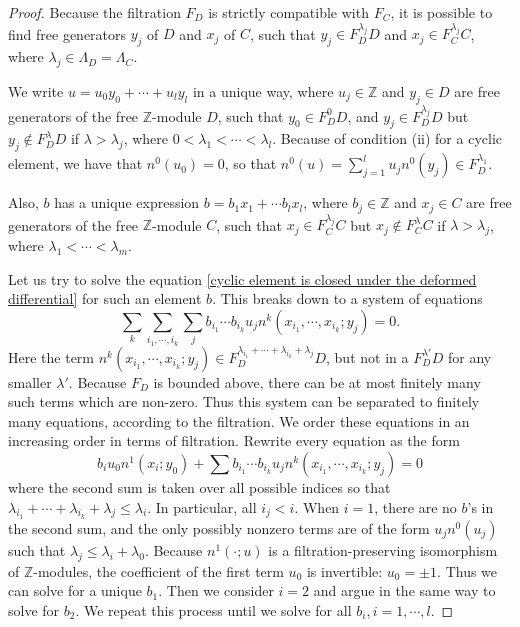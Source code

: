 \documentclass{amsart}
\numberwithin{equation}{section}
\numberwithin{figure}{section}
\begin{document}
\begin{proof}
	Because the filtration $F_{D}$ is strictly compatible with $F_{C}$, it is possible to find free generators $y_{j}$ of $D$ and $x_{j}$ of $C$, such that $y_{j} \in F_{D}^{\lambda_{j}}D$ and $x_{j} \in F_{C}^{\lambda_{j}}C$, where $\lambda_{j} \in \Lambda_{D} = \Lambda_{C}$. \par
	We write $u = u_{0} y_{0} + \cdots + u_{l} y_{l}$ in a unique way, where $u_{j} \in \mathbb{Z}$ and $y_{j} \in D$ are free generators of the free $\mathbb{Z}$-module $D$, such that $y_{0} \in F_{D}^{0}D$, and $y_{j} \in F_{D}^{\lambda_{j}}D$ but $y_{j} \notin F_{D}^{\lambda}D$ if $\lambda > \lambda_{j}$, where $0 < \lambda_{1} < \cdots < \lambda_{l}$. Because of condition (ii) for a cyclic element, we have that $n^{0}(u_{0}) = 0$, so that $n^{0}(u) = \sum_{j = 1}^{l} u_{j} n^{0}(y_{j}) \in F_{D}^{\lambda_{1}}$. \par
	Also, $b$ has a unique expression $b = b_{1} x_{1} + \cdots b_{l} x_{l}$, where $b_{j} \in \mathbb{Z}$ and $x_{j} \in C$ are free generators of the free $\mathbb{Z}$-module $C$, such that $x_{j} \in F_{C}^{\lambda_{j}}C$ but $x_{j} \notin F_{C}^{\lambda}C$ if $\lambda > \lambda_{j}$, where $\lambda_{1} < \cdots < \lambda_{m}$. \par
	Let us try to solve the equation \eqref{cyclic element is closed under the deformed differential} for such an element $b$. This breaks down to a system of equations
\begin{equation}
\sum_{k} \sum_{i_{1}, \cdots, i_{k}} \sum_{j} b_{i_{1}} \cdots b_{i_{k}} u_{j} n^{k}(x_{i_{1}}, \cdots, x_{i_{k}}; y_{j}) = 0.
\end{equation}
Here the term $n^{k}(x_{i_{1}}, \cdots, x_{i_{k}}; y_{j}) \in F_{D}^{\lambda_{i_{1}} + \cdots + \lambda_{i_{k}} + \lambda_{j}}D$, but not in a $F_{D}^{\lambda'}D$ for any smaller $\lambda'$. Because $F_{D}$ is bounded above, there can be at most finitely many such terms which are non-zero. Thus this system can be separated to finitely many equations, according to the filtration. We order these equations in an increasing order in terms of filtration. Rewrite every equation as the form
\begin{equation}
b_{i} u_{0} n^{1}(x_{i}; y_{0}) + \sum b_{i_{1}} \cdots b_{i_{k}} u_{j} n^{k}(x_{i_{1}}, \cdots, x_{i_{k}}; y_{j}) = 0
\end{equation}
where the second sum is taken over all possible indices so that $\lambda_{i_{1}} + \cdots + \lambda_{i_{k}} + \lambda_{j} \le \lambda_{i}$. In particular, all $i_{j} < i$. When $i = 1$, there are no $b$'s in the second sum, and the only possibly nonzero terms are of the form $u_{j} n^{0}(u_{j})$ such that $\lambda_{j} \le \lambda_{i} + \lambda_{0}$. Because $n^{1}(\cdot; u)$ is a filtration-preserving isomorphism of $\mathbb{Z}$-modules, the coefficient of the first term $u_{0}$ is invertible: $u_{0} = \pm 1$. Thus we can solve for a unique $b_{1}$. Then we consider $i = 2$ and argue in the same way to solve for $b_{2}$. We repeat this process until we solve for all $b_{i}, i = 1, \cdots, l$. \par

\end{proof}
\end{document}
